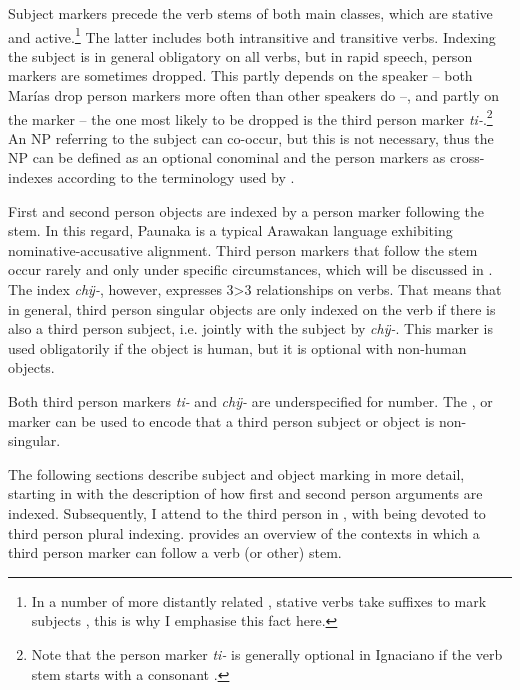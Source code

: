 Subject markers precede the verb stems of both main classes, which are stative and active.\footnote{In a number of more distantly related , stative verbs take suffixes to mark subjects \citep[cf.][212]{Aikhenvald2012}, this is why I emphasise this fact here.} The latter includes both intransitive and transitive verbs. Indexing the subject is in general obligatory on all verbs, but in rapid speech, person markers are sometimes dropped. This partly depends on the speaker -- both Marías drop person markers more often than other speakers do --, and partly on the marker – the one most likely to be dropped is the third person marker \textit{ti-}.\footnote{Note that the person marker \textit{ti-} is generally optional in Ignaciano if the verb stem starts with a consonant \citep[482]{OlzaZubiri2004}.} An NP referring to the subject can co-occur, but this is not necessary, thus the NP can be defined as an optional conominal and the person markers as cross-indexes according to the terminology used by \citet[213, 219]{Haspelmath2013}. 

First and second person objects are indexed by a person marker following the stem. In this regard, Paunaka is a typical Arawakan language \citep[cf.][]{Danielsen2014} exhibiting nominative-accusative alignment. Third person markers that follow the stem occur rarely and only under specific circumstances, which will be discussed in . The index \textit{chÿ-}, however, expresses 3>3 relationships on verbs. That means that in general, third person singular objects are only indexed on the verb if there is also a third person subject, i.e. jointly with the subject by \textit{chÿ-}. This marker is used obligatorily if the object is human, but it is optional with non-human objects.

Both third person markers \textit{ti-} and \textit{chÿ-} are underspecified for number. The ,  or  marker can be used to encode that a third person subject or object is non-singular.

The following sections describe subject and object marking in more detail, starting in  with the description of how first and second person arguments are indexed. Subsequently, I attend to the third person in , with  being devoted to third person plural indexing.  provides an overview of the contexts in which a third person marker can follow a verb (or other) stem.



